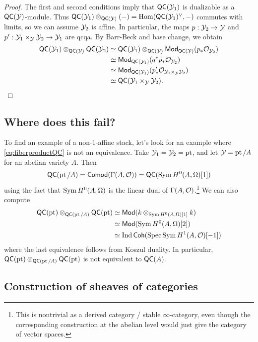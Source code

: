 \documentclass{article}
\begin{document}
\begin{proof}
	The first and second conditions imply that $\mathsf{QC}(\mathcal{Y}_1)$ is dualizable as a $\mathsf{QC}(\mathcal{Y})$-module.
	Thus $\mathsf{QC}(\mathcal{Y}_1) \otimes_{\mathsf{QC}(\mathcal{Y})} (-) = \operatorname{Hom}(\mathsf{QC}(\mathcal{Y}_1)^\vee, -)$ commutes with limits, so we can assume $\mathcal{Y}_2$ is affine.
	In particular, the maps $p: \mathcal{Y}_2 \to \mathcal{Y}$ and $p': \mathcal{Y}_1 \times_{\mathcal{Y}} \mathcal{Y}_2 \to \mathcal{Y}_1$ are qcqa.
	By Barr-Beck and base change, we obtain
	\begin{align*}
		\mathsf{QC}(\mathcal{Y}_1) \otimes_{\mathsf{QC}(\mathcal{Y})} \mathsf{QC}(\mathcal{Y}_2) &\simeq \mathsf{QC}(\mathcal{Y}_1) \otimes_{\mathsf{QC}(\mathcal{Y})} \mathsf{Mod}_{\mathsf{QC}(\mathcal{Y})}(p_* \mathcal{O}_{\mathcal{Y}_2}) \\
		&\simeq \mathsf{Mod}_{\mathsf{QC}(\mathcal{Y}_1)}(q^* p_* \mathcal{O}_{\mathcal{Y}_2}) \\
		&\simeq \mathsf{Mod}_{\mathsf{QC}(\mathcal{Y}_1)}(p'_* \mathcal{O}_{\mathcal{Y}_1 \times_{\mathcal{Y}} \mathcal{Y}_2}) \\
		&\simeq \mathsf{QC}(\mathcal{Y}_1 \times_{\mathcal{Y}} \mathcal{Y}_2).
	\end{align*}
\end{proof}

\subsection{Where does this fail?}

To find an example of a non-1-affine stack, let's look for an example where \eqref{eq:fiberproductQC} is not an equivalence.
Take $\mathcal{Y}_1 = \mathcal{Y}_2 = \operatorname{pt}$, and let $\mathcal{Y} = \operatorname{pt} / A$ for an abelian variety $A$.
Then 
\[
	\mathsf{QC}(\operatorname{pt} / A) = \mathsf{Comod}(\Gamma(A, \mathcal{O})) = \mathsf{QC}(\operatorname{Sym} H^0(A, \Omega)[1])
\]
using the fact that $\operatorname{Sym} H^0(A, \Omega)$ is the linear dual of $\Gamma(A, \mathcal{O})$.\footnote{This is nontrivial as a derived category / stable $\infty$-category, even though the corresponding construction at the abelian level would just give the category of vector spaces.}
We can also compute
\begin{align*}
	\mathsf{QC}(\operatorname{pt}) \otimes_{\mathsf{QC}(\operatorname{pt} / A)} \mathsf{QC}(\operatorname{pt}) &\simeq \mathsf{Mod}(k \otimes_{\operatorname{Sym} H^0(A, \Omega)[1]} k) \\
	&\simeq \mathsf{Mod}(\operatorname{Sym} H^0(A, \Omega)[2]) \\
	&\simeq \operatorname{Ind}\mathsf{Coh}(\operatorname{Spec} \operatorname{Sym} H^1(A, \mathcal{O})[-1])
\end{align*}
where the last equivalence follows from Koszul duality.
In particular, $\mathsf{QC}(\operatorname{pt}) \otimes_{\mathsf{QC}(\operatorname{pt} / A)} \mathsf{QC}(\operatorname{pt})$ is not equivalent to $\mathsf{QC}(A)$.

\subsection{Construction of sheaves of categories}
\end{document}
